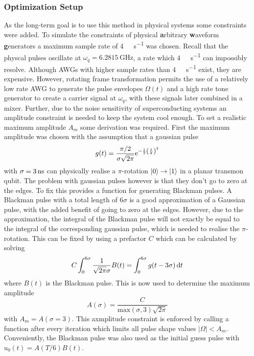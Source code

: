 \documentclass[main.tex]{subfiles}
\begin{document}
\subsubsection{Optimization Setup}
As the long-term goal is to use this method in physical systems some constraints were added.
To simulate the constraints of physical \textbf{a}rbitrary \textbf{w}aveform \textbf{g}enerators a maximum sample rate of \SI{4}{\giga\samples\per\second} was chosen.
Recall that the physcal pulses oscillate at \( \omega_{q} = \SI{6.2815}{\giga\hertz} \), a rate which \SI{4}{\giga\samples\per\second} can impossibly resolve.
Although AWGs with higher sample rates than \SI{4}{\giga\samples\per\second} exist, they are expensive.
However, rotating frame transformation permits the use of a relatively low rate AWG to generate the pulse envelopes \( \Omega(t) \) and a high rate tone generator to create a carrier signal at \( \omega_{q} \), with these signals later combined in a mixer.
Further, due to the noise sensitivity of superconducting systems an amplitude constraint is needed to keep the system cool enough.
To set a realistic maximum amplitude \( A_m \) some derivation was required.
First the maximum amplitude was chosen with the assumption that a gaussian pulse
\begin{equation}
    g(t) = \frac{\pi/2}{\sigma\sqrt{2\pi}} \mathrm{e}^{-\frac{1}{2}\qty(\frac{t}{\sigma})^2}
\end{equation}
with \( \sigma = \SI{3}{\nano\second} \) can physically realise a \(\pi\)-rotation \( \ket{0} \rightarrow \ket{1} \) in a planar transmon qubit.
The problem with gaussian pulses however is that they don't go to zero at the edges.
To fix this \krotov{} provides a function for generating Blackman pulses.
A Blackman pulse with a total length of \(6\sigma\) is a good approximation of a Gaussian pulse, with the added benefit of going to zero at the edges.
However, due to the approximation, the integral of the Blackman pulse will not exactly be equal to the integral of the corresponding gaussian pulse, which is needed to realise the \(\pi\)-rotation.
This can be fixed by using a prefactor \(C\) which can be calculated by solving
\begin{equation}
    C \int_0^{6\sigma}\frac{1}{\sqrt{2\pi}\sigma} B(t) = \int_0^{6\sigma}g(t-3\sigma)\,\mathrm{d} t
\end{equation}
where \(B(t)\) is the Blackman pulse.
This is now used to determine the maximum amplitude
\begin{equation}
    A(\sigma) = \frac{C}{\text{max}(\sigma,3)\sqrt{2\pi}}
\end{equation}
with \(A_m = A(\sigma = 3)\). 
This axmplitude constraint is enforced by calling a function after every iteration which limits all pulse shape values \(|\Omega| < A_m\).
Conveniently, the Blackman pulse was also used as the initial guess pulse with \(u_0(t) = A(T/6)B(t)\).
\end{document}
